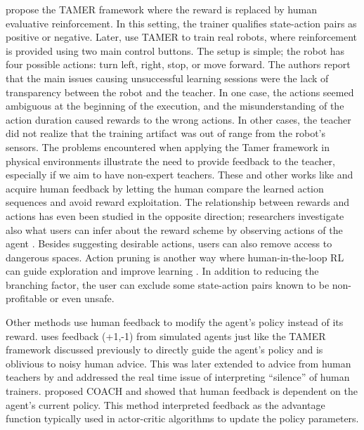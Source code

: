 \documentclass[twoside,11pt]{article}
\begin{document}
\cite{Knox:2008:TAMER} propose the TAMER framework where the reward is replaced by human evaluative reinforcement. In this setting, the trainer qualifies state-action pairs as positive or negative. Later, \cite{knox:13} use TAMER to train real robots, where reinforcement is provided using two main control buttons. The setup is simple;  the robot has four possible actions: turn left, right, stop, or move forward. The authors report that the main issues causing unsuccessful learning sessions were the lack of transparency between the robot and the teacher. In one case, the actions seemed ambiguous at the beginning of the execution, and the misunderstanding of the action duration caused rewards to the wrong actions. In other cases, the teacher did not realize that the training artifact was out of range from the robot's sensors. The problems encountered when applying the Tamer framework in physical environments illustrate the need to provide feedback to the teacher, especially if we aim to have non-expert teachers. These and other works like \cite{Christiano:2017:DeepRLHumanPreferences} and \cite{LeeSmithAbbeel:2021:FeedbackPreferenceHITLLearningPEBBLE} acquire human feedback by letting the human compare the learned action sequences and avoid reward exploitation. The relationship between rewards and actions has even been studied in the opposite direction; researchers investigate also what users can infer about the reward scheme by observing actions of the agent \citep{Abbeel:2004:InverseRL}. Besides suggesting desirable actions, users can also remove access to dangerous spaces. Action pruning is another way where human-in-the-loop RL can guide exploration and improve learning \citep{Abel:2017:AgentAgnosticHumanInTheLoopRL}. In addition to reducing the branching factor, the user can exclude some state-action pairs known to be non-profitable or even unsafe.

Other methods use human feedback to modify the agent's policy instead of its reward. \cite{griffith2013policy} uses feedback (+1,-1) from simulated agents just like the TAMER framework discussed previously to directly guide the agent’s policy and is oblivious to noisy human advice. This was later extended to advice from human teachers by \cite{cederborg2015policy} and addressed the real time issue of interpreting “silence” of human trainers. \cite{macglashan2017interactive} proposed COACH and showed that human feedback is dependent on the agent’s current policy. This method interpreted feedback as the advantage function typically used in actor-critic algorithms to update the policy parameters.
\end{document}
